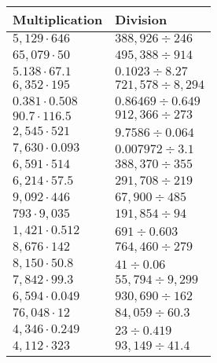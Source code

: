 \begin{longtable}[]{@{}ll@{}}
\toprule
Multiplication & Division\tabularnewline
\midrule
\endhead
\(5,129\cdot646\) & \(388,926÷246\)\tabularnewline
\(65,079\cdot50\) & \(495,388÷914\)\tabularnewline
\(5.138\cdot67.1\) & \(0.1023÷8.27\)\tabularnewline
\(6,352\cdot195\) & \(721,578÷8,294\)\tabularnewline
\(0.381\cdot0.508\) & \(0.86469÷0.649\)\tabularnewline
\(90.7\cdot116.5\) & \(912,366÷273\)\tabularnewline
\(2,545\cdot521\) & \(9.7586÷0.064\)\tabularnewline
\(7,630\cdot0.093\) & \(0.007972÷3.1\)\tabularnewline
\(6,591\cdot514\) & \(388,370÷355\)\tabularnewline
\(6,214\cdot57.5\) & \(291,708÷219\)\tabularnewline
\(9,092\cdot446\) & \(67,900÷485\)\tabularnewline
\(793\cdot9,035\) & \(191,854÷94\)\tabularnewline
\(1,421\cdot0.512\) & \(691÷0.603\)\tabularnewline
\(8,676\cdot142\) & \(764,460÷279\)\tabularnewline
\(8,150\cdot50.8\) & \(41÷0.06\)\tabularnewline
\(7,842\cdot99.3\) & \(55,794÷9,299\)\tabularnewline
\(6,594\cdot0.049\) & \(930,690÷162\)\tabularnewline
\(76,048\cdot12\) & \(84,059÷60.3\)\tabularnewline
\(4,346\cdot0.249\) & \(23÷0.419\)\tabularnewline
\(4,112\cdot323\) & \(93,149÷41.4\)\tabularnewline
\bottomrule
\end{longtable}
